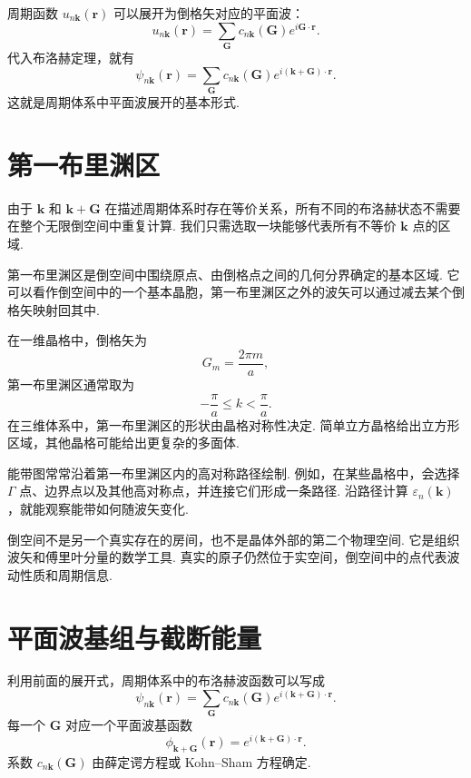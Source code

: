\documentclass[UTF8,11pt,a4paper,openany]{ctexbook}
\begin{document}
周期函数 $u_{n\mathbf k}(\mathbf r)$ 可以展开为倒格矢对应的平面波：
\[
u_{n\mathbf k}(\mathbf r)
=
\sum_{\mathbf G}
c_{n\mathbf k}(\mathbf G)
e^{i\mathbf G\cdot\mathbf r}.
\]
代入布洛赫定理，就有
\[
\psi_{n\mathbf k}(\mathbf r)
=
\sum_{\mathbf G}
c_{n\mathbf k}(\mathbf G)
e^{i(\mathbf k+\mathbf G)\cdot\mathbf r}.
\]
这就是周期体系中平面波展开的基本形式. 

\section{第一布里渊区}

由于 $\mathbf k$ 和 $\mathbf k+\mathbf G$ 在描述周期体系时存在等价关系，所有不同的布洛赫状态不需要在整个无限倒空间中重复计算. 我们只需选取一块能够代表所有不等价 $\mathbf k$ 点的区域. 

\begin{definitionbox}
第一布里渊区是倒空间中围绕原点、由倒格点之间的几何分界确定的基本区域. 它可以看作倒空间中的一个基本晶胞，第一布里渊区之外的波矢可以通过减去某个倒格矢映射回其中. 
\end{definitionbox}

在一维晶格中，倒格矢为
\[
G_m=\frac{2\pi m}{a},
\]
第一布里渊区通常取为
\[
-\frac{\pi}{a}\leq k<\frac{\pi}{a}.
\]
在三维体系中，第一布里渊区的形状由晶格对称性决定. 简单立方晶格给出立方形区域，其他晶格可能给出更复杂的多面体. 

能带图常常沿着第一布里渊区内的高对称路径绘制. 例如，在某些晶格中，会选择 $\Gamma$ 点、边界点以及其他高对称点，并连接它们形成一条路径. 沿路径计算 $\varepsilon_n(\mathbf k)$，就能观察能带如何随波矢变化. 

\begin{limitbox}
倒空间不是另一个真实存在的房间，也不是晶体外部的第二个物理空间. 它是组织波矢和傅里叶分量的数学工具. 真实的原子仍然位于实空间，倒空间中的点代表波动性质和周期信息. 
\end{limitbox}

\section{平面波基组与截断能量}

利用前面的展开式，周期体系中的布洛赫波函数可以写成
\[
\psi_{n\mathbf k}(\mathbf r)
=
\sum_{\mathbf G}
c_{n\mathbf k}(\mathbf G)
e^{i(\mathbf k+\mathbf G)\cdot\mathbf r}.
\]
每一个 $\mathbf G$ 对应一个平面波基函数
\[
\phi_{\mathbf k+\mathbf G}(\mathbf r)
=
e^{i(\mathbf k+\mathbf G)\cdot\mathbf r}.
\]
系数 $c_{n\mathbf k}(\mathbf G)$ 由薛定谔方程或 Kohn--Sham 方程确定. 
\end{document}

